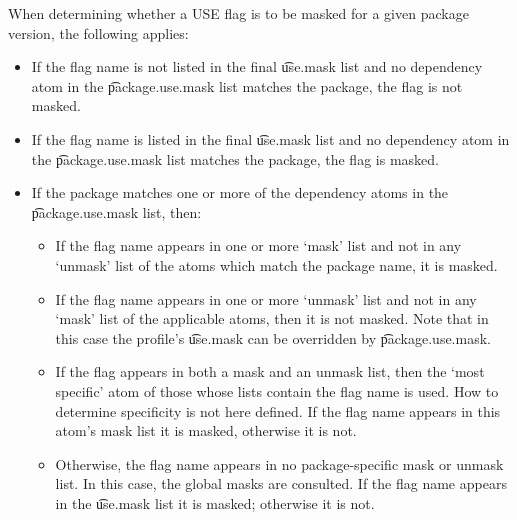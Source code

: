 When determining whether a USE flag is to be masked for a given package version, the following
applies:
\begin{itemize}
\item If the flag name is not listed in the final \t{use.mask} list and no dependency atom in the
    \t{package.use.mask} list matches the package, the flag is not masked.
\item If the flag name is listed in the final \t{use.mask} list and no dependency atom in the
    \t{package.use.mask} list matches the package, the flag is masked.
\item If the package matches one or more of the dependency atoms in the \t{package.use.mask} list,
    then:
    \begin{itemize}
    \item If the flag name appears in one or more `mask' list and not in any `unmask' list of the
        atoms which match the package name, it is masked.
    \item If the flag name appears in one or more `unmask' list and not in any `mask' list of the
        applicable atoms, then it is not masked. Note that in this case the profile's \t{use.mask}
        can be overridden by \t{package.use.mask}.
    \item If the flag appears in both a mask and an unmask list, then the `most specific' atom of
        those whose lists contain the flag name is used. How to determine specificity is not here
        defined. If the flag name appears in this atom's mask list it is masked, otherwise it is
        not.
    \item Otherwise, the flag name appears in no package-specific mask or unmask list. In this case,
        the global masks are consulted. If the flag name appears in the \t{use.mask} list it is
        masked; otherwise it is not.
    \end{itemize}
\end{itemize}


\label{use-expand}


